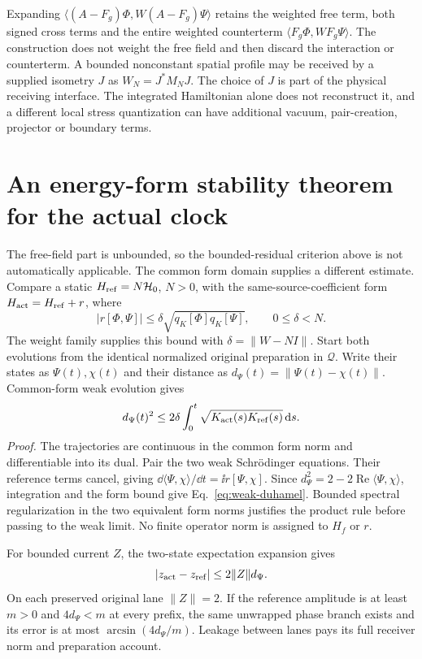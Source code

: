 Expanding $\langle(A-F_g)\Phi,W(A-F_g)\Psi\rangle$ retains the weighted free term, both signed cross terms and the entire weighted counterterm $\langle F_g\Phi,WF_g\Psi\rangle$. The construction does not weight the free field and then discard the interaction or counterterm. A bounded nonconstant spatial profile may be received by a supplied isometry $J$ as $W_N=J^*M_NJ$. The choice of $J$ is part of the physical receiving interface. The integrated Hamiltonian alone does not reconstruct it, and a different local stress quantization can have additional vacuum, pair-creation, projector or boundary terms.

\section{An energy-form stability theorem for the actual clock}\label{sec:form-stability}
The free-field part is unbounded, so the bounded-residual criterion above is not automatically applicable. The common form domain supplies a different estimate. Compare a static $H_{\rm ref}=N\mathcal H_0$, $N>0$, with the same-source-coefficient form $H_{\rm act}=H_{\rm ref}+r$, where
\[
 |r[\Phi,\Psi]|\le\delta\sqrt{q_K[\Phi]q_K[\Psi]},\qquad
 0\le\delta<N.
\]
The weight family supplies this bound with $\delta=\|W-NI\|$. Start both evolutions from the identical normalized original preparation in $\mathcal Q$. Write their states as $\Psi(t),\chi(t)$ and their distance as $d_\Psi(t)=\|\Psi(t)-\chi(t)\|$. Common-form weak evolution gives
\begin{equation}
 d_\Psi(t)^2\le2\delta\int_0^t
 \sqrt{K_{\rm act}(s)K_{\rm ref}(s)}\,\mathrm{d} s.
 \label{eq:weak-duhamel}
\end{equation}
\textit{Proof.} The trajectories are continuous in the common form norm and differentiable into its dual. Pair the two weak Schr\"odinger equations. Their reference terms cancel, giving $\dd\langle\Psi,\chi\rangle/\dd t=\ii r[\Psi,\chi]$. Since $d_\Psi^2=2-2\operatorname{Re}\langle\Psi,\chi\rangle$, integration and the form bound give Eq.~\eqref{eq:weak-duhamel}. Bounded spectral regularization in the two equivalent form norms justifies the product rule before passing to the weak limit. No finite operator norm is assigned to $H_f$ or $r$.

For bounded current $Z$, the two-state expectation expansion gives
\[
 |z_{\rm act}-z_{\rm ref}|\le2\|Z\|d_\Psi.
\]
On each preserved original lane $\|Z\|=2$. If the reference amplitude is at least $m>0$ and $4d_\Psi<m$ at every prefix, the same unwrapped phase branch exists and its error is at most $\arcsin(4d_\Psi/m)$. Leakage between lanes pays its full receiver norm and preparation account.

